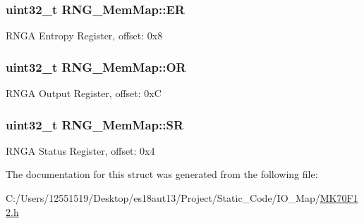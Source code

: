 \subsubsection[{E\+R}]{\setlength{\rightskip}{0pt plus 5cm}uint32\+\_\+t R\+N\+G\+\_\+\+Mem\+Map\+::\+E\+R}\label{struct_r_n_g___mem_map_a00c023d8dafb81ac55c86b3ad8decb3d}
R\+N\+G\+A Entropy Register, offset\+: 0x8 \hypertarget{struct_r_n_g___mem_map_a28a39f4167d28546cea918687d2951f1}{}
\subsubsection[{O\+R}]{\setlength{\rightskip}{0pt plus 5cm}uint32\+\_\+t R\+N\+G\+\_\+\+Mem\+Map\+::\+O\+R}\label{struct_r_n_g___mem_map_a28a39f4167d28546cea918687d2951f1}
R\+N\+G\+A Output Register, offset\+: 0x\+C \hypertarget{struct_r_n_g___mem_map_a5d258b2ed1915070a6d3651092d8f3c7}{}
\subsubsection[{S\+R}]{\setlength{\rightskip}{0pt plus 5cm}uint32\+\_\+t R\+N\+G\+\_\+\+Mem\+Map\+::\+S\+R}\label{struct_r_n_g___mem_map_a5d258b2ed1915070a6d3651092d8f3c7}
R\+N\+G\+A Status Register, offset\+: 0x4 

The documentation for this struct was generated from the following file\+:\begin{DoxyCompactItemize}
\item 
C\+:/\+Users/12551519/\+Desktop/es18aut13/\+Project/\+Static\+\_\+\+Code/\+I\+O\+\_\+\+Map/\hyperlink{_m_k70_f12_8h}{M\+K70\+F12.\+h}\end{DoxyCompactItemize}
